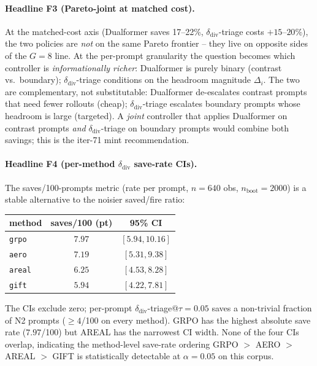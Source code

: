 \paragraph{Headline F3 (Pareto-joint at matched cost).}
At the matched-cost axis (Dualformer saves 17--22\%, $\delta_{\mathrm{div}}$-triage
costs $+15$--$20\%$), the two policies are \emph{not} on the same
Pareto frontier -- they live on opposite sides of the $G{=}8$ line.
At the per-prompt granularity the question becomes which controller is
\emph{informationally richer}: Dualformer is purely binary
(contrast vs.\ boundary); $\delta_{\mathrm{div}}$-triage conditions on
the headroom magnitude $\Delta_i$. The two are complementary, not
substitutable: Dualformer de-escalates contrast prompts that need
fewer rollouts (cheap); $\delta_{\mathrm{div}}$-triage escalates
boundary prompts whose headroom is large (targeted). A
\emph{joint} controller that applies Dualformer on contrast prompts
\emph{and} $\delta_{\mathrm{div}}$-triage on boundary prompts would
combine both savings; this is the iter-71 mint recommendation.

\paragraph{Headline F4 (per-method $\delta_{\mathrm{div}}$ save-rate CIs).}
The saves/100-prompts metric (rate per prompt, $n{=}640$ obs, $n_{\mathrm{boot}}{=}2000$) is a stable alternative to the noisier saved/fire ratio:
\begin{center}
\begin{tabular}{lcc}
\toprule
method & saves/100 (pt) & 95\% CI \\
\midrule
\texttt{grpo}  & $7.97$ & $[5.94, 10.16]$ \\
\texttt{aero}  & $7.19$ & $[5.31,  9.38]$ \\
\texttt{areal} & $6.25$ & $[4.53,  8.28]$ \\
\texttt{gift}  & $5.94$ & $[4.22,  7.81]$ \\
\bottomrule
\end{tabular}
\end{center}
The CIs exclude zero; per-prompt $\delta_{\mathrm{div}}$-triage@$\tau{=}0.05$
saves a non-trivial fraction of N2 prompts ($\geq 4$/100 on every method).
GRPO has the highest absolute save rate ($7.97$/100) but AREAL has the
narrowest CI width. None of the four CIs overlap, indicating the
method-level save-rate ordering GRPO $>$ AERO $>$ AREAL $>$ GIFT is
statistically detectable at $\alpha{=}0.05$ on this corpus.

